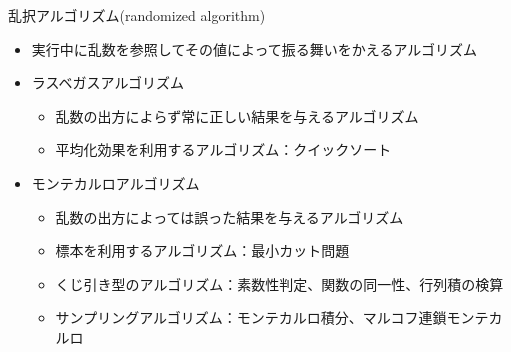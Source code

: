 \begin{frame}[t,fragile]{乱択アルゴリズム(randomized algorithm)}
  \begin{itemize}
  \item 実行中に乱数を参照してその値によって振る舞いをかえるアルゴリズム
  \item ラスベガスアルゴリズム
    \begin{itemize}
    \item 乱数の出方によらず常に正しい結果を与えるアルゴリズム
    \item 平均化効果を利用するアルゴリズム：クイックソート
    \end{itemize}
  \item モンテカルロアルゴリズム
    \begin{itemize}
    \item 乱数の出方によっては誤った結果を与えるアルゴリズム
    \item 標本を利用するアルゴリズム：最小カット問題
    \item くじ引き型のアルゴリズム：素数性判定、関数の同一性、行列積の検算
    \item サンプリングアルゴリズム：モンテカルロ積分、マルコフ連鎖モンテカルロ
    \end{itemize}
  \end{itemize}
\end{frame}
